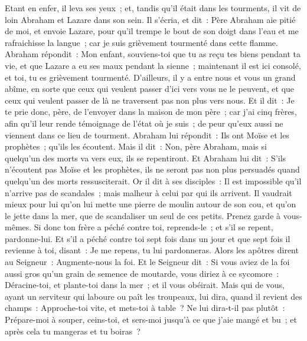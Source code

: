 \begin{multicols}{2}
Etant en enfer, il leva ses yeux~; et, tandis qu'il était dans les tourments, il vit de loin Abraham et Lazare dans son sein.
Il s'écria, et dit~: Père Abraham aie pitié de moi, et envoie Lazare, pour qu'il trempe le bout de son doigt dans l'eau et me rafraichisse la langue~; car je suis grièvement tourmenté dans cette flamme.
Abraham répondit~: Mon enfant, souviens-toi que tu as reçu tes biens pendant ta vie, et que Lazare a eu ses maux pendant la sienne~; maintenant il est ici consolé, et toi, tu es grièvement tourmenté.
D'ailleurs, il y a entre nous et vous un grand abîme, en sorte que ceux qui veulent passer d'ici vers vous ne le peuvent, et que ceux qui veulent passer de là ne traversent pas non plus vers nous.
Et il dit~: Je te prie donc, père, de l'envoyer dans la maison de mon père~; car j'ai cinq frères,
afin qu'il leur rende témoignage de l'état où je suis~; de peur qu'eux aussi ne viennent dans ce lieu de tourment.
Abraham lui répondit~: Ils ont Moïse et les prophètes~; qu'ils les écoutent.
Mais il dit~: Non, père Abraham, mais si quelqu'un des morts va vers eux, ils se repentiront.
Et Abraham lui dit~: S'ils n'écoutent pas Moïse et les prophètes, ils ne seront pas non plus persuadés quand quelqu'un des morts ressusciterait.
\VerseOne{}Or il dit à ses disciples~: Il est impossible qu'il n'arrive pas de scandales~; mais malheur à celui par qui ils arrivent.
Il vaudrait mieux pour lui qu'on lui mette une pierre de moulin autour de son cou, et qu'on le jette dans la mer, que de scandaliser un seul de ces petits.
Prenez garde à vous-mêmes. Si donc ton frère a péché contre toi, reprends-le~; et s'il se repent, pardonne-lui.
Et s'il a péché contre toi sept fois dans un jour et que sept fois il revienne à toi, disant~: Je me repens, tu lui pardonneras.
Alors les apôtres dirent au Seigneur~: Augmente-nous la foi.
Et le Seigneur dit~: Si vous aviez de la foi aussi gros qu'un grain de semence de moutarde, vous diriez à ce sycomore~: Déracine-toi, et plante-toi dans la mer~; et il vous obéirait.
Mais qui de vous, ayant un serviteur qui laboure ou paît les troupeaux, lui dira, quand il revient des champs~: Approche-toi vite, et mets-toi à table~?
Ne lui dira-t-il pas plutôt~: Prépare-moi à souper, ceins-toi, et sers-moi jusqu'à ce que j'aie mangé et bu~; et après cela tu mangeras et tu boiras~?

\end{multicols}
